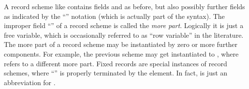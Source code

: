 \begin{isabellebody}
\begin{isamarkuptext}
  A record scheme like  contains fields
   and  as before, but also possibly further fields
  as indicated by the ``'' notation (which is actually part
  of the syntax).  The improper field ``'' of a record
  scheme is called the \emph{more part}.  Logically it is just a free
  variable, which is occasionally referred to as ``row variable'' in
  the literature.  The more part of a record scheme may be
  instantiated by zero or more further components.  For example, the
  previous scheme may get instantiated to , where  refers to a different more part.
  Fixed records are special instances of record schemes, where
  ``'' is properly terminated by the 
  element.  In fact,  is just an abbreviation
  for .


\end{isamarkuptext}
\end{isabellebody}
